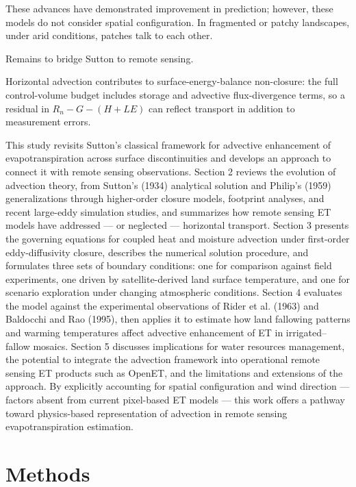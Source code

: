 \documentclass{article}
\begin{document}
    
    
    These advances have demonstrated improvement in prediction; however, these models do not consider spatial configuration.
    In fragmented or patchy landscapes, under arid conditions, patches talk to each other. 
    
    Remains to bridge Sutton to remote sensing. 
    
    Horizontal advection contributes to surface-energy-balance non-closure: the full control-volume budget includes storage and advective flux-divergence terms, so a residual in $R_n - G - (H+LE)$ can reflect transport in addition to measurement errors. 
    
    

This study revisits Sutton's classical framework for advective enhancement of evapotranspiration across surface discontinuities and develops an approach to connect it with remote sensing observations. Section 2 reviews the evolution of advection theory, from Sutton's (1934) analytical solution and Philip's (1959) generalizations through higher-order closure models, footprint analyses, and recent large-eddy simulation studies, and summarizes how remote sensing ET models have addressed — or neglected — horizontal transport. Section 3 presents the governing equations for coupled heat and moisture advection under first-order eddy-diffusivity closure, describes the numerical solution procedure, and formulates three sets of boundary conditions: one for comparison against field experiments, one driven by satellite-derived land surface temperature, and one for scenario exploration under changing atmospheric conditions. Section 4 evaluates the model against the experimental observations of Rider et al. (1963) and Baldocchi and Rao (1995), then applies it to estimate how land fallowing patterns and warming temperatures affect advective enhancement of ET in irrigated–fallow mosaics. Section 5 discusses implications for water resources management, the potential to integrate the advection framework into operational remote sensing ET products such as OpenET, and the limitations and extensions of the approach. By explicitly accounting for spatial configuration and wind direction — factors absent from current pixel-based ET models — this work offers a pathway toward physics-based representation of advection in remote sensing evapotranspiration estimation.
    
    
    \section{Methods}
    
\end{document}
